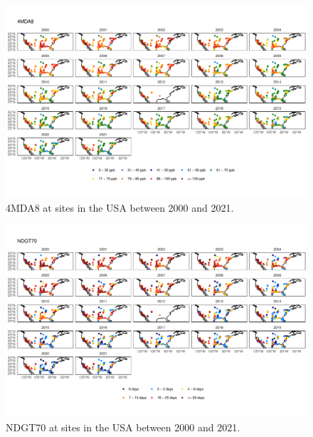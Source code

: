 \documentclass{article}
\begin{document}

\begin{figure}
\centering
\includegraphics[height=0.75\textheight]{figures/si_figures/fS16_metric_map_United-States-of-America_4MDA8.pdf}
\caption{4MDA8 at sites in the USA between 2000 and 2021.}
\label{si_fig:metric_map_us_4MDA8}
\end{figure}
\clearpage

\begin{figure}
\centering
\includegraphics[height=0.75\textheight]{figures/si_figures/fS17_metric_map_United-States-of-America_NDGT70.pdf}
\caption{NDGT70 at sites in the USA between 2000 and 2021.}
\label{si_fig:metric_map_us_NDGT70}
\end{figure}
\clearpage
\end{document}
